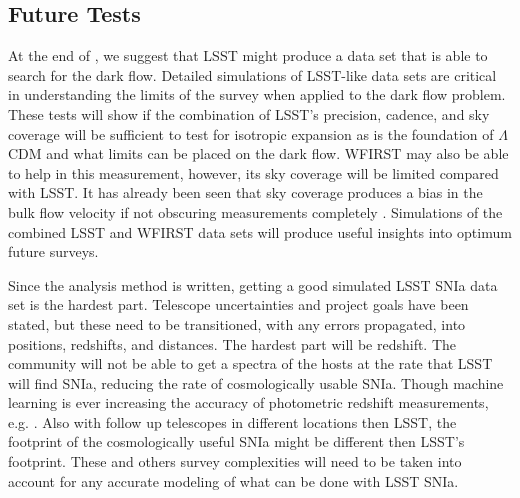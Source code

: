 \documentclass[apj, iop]{emulateapj}
\newcommand{\sn}{SNIa}
\newcommand{\todo}[1]{\textbf{\textcolor{red}{#1}}}
\newcommand{\lcdm}{$\Lambda$CDM}     %
\begin{document}
\subsection{Future Tests}\label{future-tests}

At the end of \cite{Mathews16}, we suggest that LSST might produce a data set
that is able to search for the dark flow. Detailed simulations of LSST-like data
sets are critical in understanding the limits of the survey when applied to the
dark flow problem. These tests will show if the combination of LSST's precision,
cadence, and sky coverage will be sufficient to test for isotropic expansion as
is the foundation of \lcdm{} and what limits can be placed on the dark flow.
WFIRST may also be able to help in this measurement, however, its sky coverage
will be limited compared with LSST. It has already been seen that sky coverage
produces a bias in the bulk flow velocity \citep{Appleby14} if not obscuring
measurements completely \citep{Mathews16}. Simulations of the combined LSST and
WFIRST data sets will produce useful insights into optimum future surveys.

Since the analysis method is written, getting a good simulated LSST \sn{} data
set is the hardest part. Telescope uncertainties and project goals have been
stated, but these need to be transitioned, with any errors propagated, into
positions, redshifts, and distances. The hardest part will be redshift. The
community will not be able to get a spectra of the hosts at the rate that LSST
will find \sn, reducing the rate of cosmologically usable \sn. Though machine
learning is ever increasing the accuracy of photometric redshift measurements,
e.g. \cite{Kind13}. Also with follow up telescopes in different locations then
LSST, the footprint of the cosmologically useful \sn{} might be different then
LSST's footprint. These and others survey complexities will need to be taken
into account for any accurate modeling of what can be done with LSST \sn{}.
\end{document}
